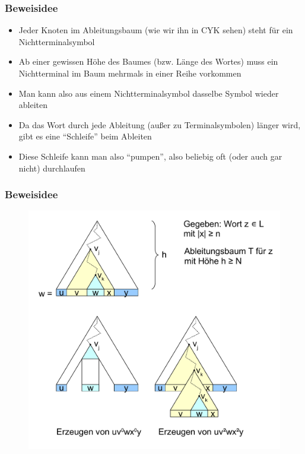 \begin{frame}
	\frametitle{Beweisidee}
	\begin{itemize}
		\item Jeder Knoten im Ableitungsbaum (wie wir ihn in CYK sehen) steht für ein Nichtterminalsymbol
		\item Ab einer gewissen Höhe des Baumes (bzw. Länge des Wortes) muss ein Nichtterminal im Baum mehrmals in einer Reihe vorkommen
		\item Man kann also aus einem Nichtterminalsymbol dasselbe Symbol wieder ableiten
		\item Da das Wort durch jede Ableitung (außer zu Terminalsymbolen) länger wird, gibt es eine "`Schleife"' beim Ableiten
		\item Diese Schleife kann man also "`pumpen"', also beliebig oft (oder auch gar nicht) durchlaufen
	\end{itemize}
\end{frame}

\begin{frame}
	\frametitle{Beweisidee}
	\begin{figure}[H]
		\centering
		\includegraphics[scale=0.5]{images/pumping}
	\end{figure}
\end{frame}


